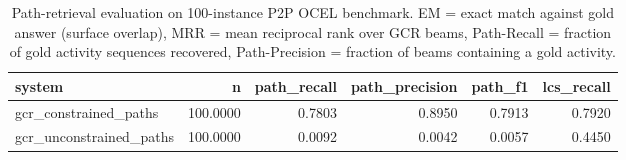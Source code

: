 \begin{table}
\caption{Path-retrieval evaluation on 100-instance P2P OCEL benchmark. EM = exact match against gold answer (surface overlap), MRR = mean reciprocal rank over GCR beams, Path-Recall = fraction of gold activity sequences recovered, Path-Precision = fraction of beams containing a gold activity.}
\label{tab:path_results}
\begin{tabular}{lrrrrr}
\toprule
system & n & path_recall & path_precision & path_f1 & lcs_recall \\
\midrule
gcr_constrained_paths & 100.0000 & 0.7803 & 0.8950 & 0.7913 & 0.7920 \\
gcr_unconstrained_paths & 100.0000 & 0.0092 & 0.0042 & 0.0057 & 0.4450 \\
\bottomrule
\end{tabular}
\end{table}
